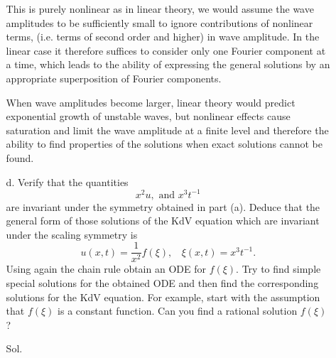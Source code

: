 \documentclass[]{report}
\begin{document}
\begin{itemize}
\begin{itemize}
		This is purely nonlinear as in linear theory, we would assume the wave amplitudes to be sufficiently small to ignore contributions of nonlinear terms, (i.e. terms of second order and higher) in wave amplitude. In the linear case it therefore suffices to consider only one Fourier component at a time, which leads to the ability of expressing the general solutions by an appropriate superposition of Fourier components. 
		
		When wave amplitudes become larger, linear theory would predict exponential growth of unstable waves, but nonlinear effects cause saturation and limit the wave amplitude at a finite level and therefore the ability to find properties of the solutions when exact solutions cannot be found.
		\item[d.] Verify that the quantities
		\begin{equation}
			x^2u, \text{ and } x^3t^{-1}
		\end{equation}
		are invariant under the symmetry obtained in part (a). Deduce that the general form of those solutions of the KdV equation which are invariant under the scaling symmetry is
		\begin{equation}
			u(x, t) = \frac{1}{x^2}f(\xi), \ \ \ \ \xi(x, t) = x^3t^{-1}. 
		\end{equation}
		Using again the chain rule obtain an ODE for $f(\xi)$. Try to find simple special solutions for the obtained ODE and then find the corresponding solutions for the KdV equation. For example, start with the assumption that $f(\xi)$ is a constant function. Can you find a rational solution $f(\xi)$?
		\item[Sol.]
	\end{itemize}
	

\end{itemize}
\end{document}
